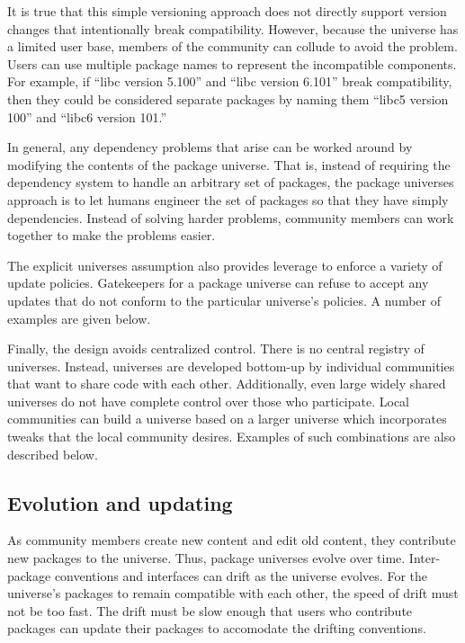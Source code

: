 \documentclass{article}
\begin{document}
It is true that this simple versioning approach does not directly
support version changes that intentionally break compatibility.
However, because the universe has a limited user base, members of the
community can collude to avoid the problem.  Users can use multiple
package names to represent the incompatible components.  For example,
if ``libc version 5.100'' and ``libc version 6.101'' break
compatibility, then they could be considered separate packages by
naming them ``libc5 version 100'' and ``libc6 version 101.''


In general, any dependency problems that arise can be worked around by
modifying the contents of the package universe.  That is, instead of
requiring the dependency system to handle an arbitrary set of
packages, the package universes approach is to let humans engineer the
set of packages so that they have simply dependencies.  Instead of
solving harder problems, community members can work together to make
the problems easier.


The explicit universes assumption also provides leverage to enforce a
variety of update policies.  Gatekeepers for a package universe can
refuse to accept any updates that do not conform to the particular
universe's policies.  A number of examples are given below.

Finally, the design avoids centralized control.  There is no central
registry of universes.  Instead, universes are developed bottom-up by
individual communities that want to share code with each other.
Additionally, even large widely shared universes do not have complete
control over those who participate.  Local communities can build a
universe based on a larger universe which incorporates tweaks that the
local community desires.  Examples of such combinations are also
described below.



\subsection{Evolution and updating}
As community members create new content and edit old content, they
contribute new packages to the universe.  Thus, package universes
evolve over time.  Inter-package conventions and interfaces can drift
as the universe evolves.  For the universe's packages to remain
compatible with each other, the speed of drift must not be too fast.
The drift must be slow enough that users who contribute packages can
update their packages to accomodate the drifting conventions.
\end{document}
